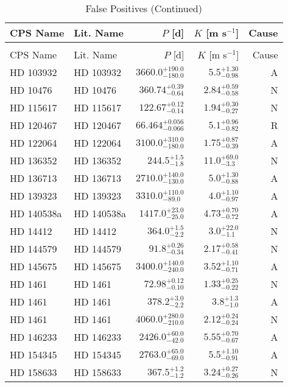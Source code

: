 \begin{longtable*}{llrrr}
\caption{False Positives} \\
\toprule 
\midrule 

CPS Name & Lit. Name & $P$ [d] & $K$ [m s$^{-1}$] & Cause \\ 
\endfirsthead 
\caption[]{False Positives (Continued)} \\
\toprule 
\midrule 
CPS Name & Lit. Name & $P$ [d] & $K$ [m s$^{-1}$] & Cause \\ 
\toprule 
\endhead 
HD 103932 & HD 103932 & $3660.0^{+190.0}_{-180.0}$ & $5.5^{+1.30}_{-0.98}$ & A \\ 
HD 10476 & HD 10476 & $360.74^{+0.39}_{-0.64}$ & $2.84^{+0.59}_{-0.58}$ & N \\ 
HD 115617 & HD 115617 & $122.67^{+0.12}_{-0.14}$ & $1.94^{+0.30}_{-0.27}$ & N \\ 
HD 120467 & HD 120467 & $66.464^{+0.056}_{-0.066}$ & $5.1^{+0.96}_{-0.82}$ & R \\ 
HD 122064 & HD 122064 & $3100.0^{+310.0}_{-180.0}$ & $1.75^{+0.87}_{-0.39}$ & A \\ 
HD 136352 & HD 136352 & $244.5^{+1.5}_{-1.8}$ & $11.0^{+69.0}_{-3.3}$ & N \\ 
HD 136713 & HD 136713 & $2710.0^{+140.0}_{-130.0}$ & $5.0^{+1.30}_{-0.88}$ & A \\ 
HD 139323 & HD 139323 & $3310.0^{+110.0}_{-89.0}$ & $4.0^{+1.10}_{-0.97}$ & A \\ 
HD 140538a & HD 140538a & $1417.0^{+23.0}_{-25.0}$ & $4.73^{+0.70}_{-0.72}$ & A \\ 
HD 14412 & HD 14412 & $364.0^{+1.5}_{-2.2}$ & $3.0^{+22.0}_{-1.1}$ & N \\ 
HD 144579 & HD 144579 & $91.8^{+0.26}_{-0.34}$ & $2.17^{+0.58}_{-0.41}$ & N \\ 
HD 145675 & HD 145675 & $3400.0^{+140.0}_{-240.0}$ & $3.52^{+1.10}_{-0.71}$ & A \\ 
HD 1461 & HD 1461 & $72.98^{+0.12}_{-0.10}$ & $1.33^{+0.25}_{-0.22}$ & N \\ 
HD 1461 & HD 1461 & $378.2^{+3.0}_{-2.2}$ & $3.8^{+1.3}_{-1.0}$ & A \\ 
HD 1461 & HD 1461 & $4060.0^{+280.0}_{-210.0}$ & $2.12^{+0.24}_{-0.24}$ & N \\ 
HD 146233 & HD 146233 & $2426.0^{+60.0}_{-42.0}$ & $5.55^{+0.70}_{-0.67}$ & A \\ 
HD 154345 & HD 154345 & $2763.0^{+65.0}_{-69.0}$ & $5.5^{+1.10}_{-0.91}$ & A \\ 
HD 158633 & HD 158633 & $367.5^{+1.2}_{-1.2}$ & $3.24^{+0.27}_{-0.26}$ & N \\ 

\end{longtable*}
